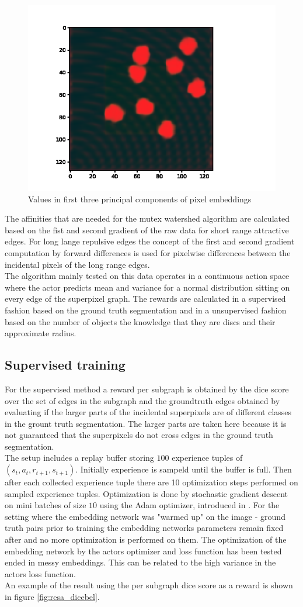 \begin{figure}[ht!]
	\centering
	\includegraphics[width=.5\textwidth]{figures/plots/pix_embeddings.png}
	\caption{Values in first three principal components of pixel embeddings}
	\label{fig:pixembeddings}
\end{figure}

The affinities that are needed for the mutex watershed algorithm are calculated based on the fist and second gradient of the raw data for short range attractive edges. For long lange repulsive edges the concept of the first and second gradient computation by forward differences is used for pixelwise differences between the incidental pixels of the long range edges.\\
The algorithm mainly tested on this data operates in a continuous action space where the actor predicts mean and variance for a normal distribution sitting on every edge of the superpixel graph. The rewards are calculated in a supervised fashion based on the ground truth segmentation and in a unsupervised fashion based on the number of objects the knowledge that they are discs and their approximate radius.
\subsection{Supervised training}
For the supervised method a reward per subgraph is obtained by the dice score over the set of edges in the subgraph and the groundtruth edges obtained by evaluating if the larger parts of the incidental superpixels are of different classes in the grount truth segmentation. The larger parts are taken here because it is not guaranteed that the superpixels do not cross edges in the ground truth segmentation.\\
The setup includes a replay buffer storing $100$ experience tuples of $(s_t, a_t, r_{t+1}, s_{t+1})$. Initially experience is sampeld until the buffer is full. Then after each collected experience tuple there are 10 optimization steps performed on sampled experience tuples. Optimization is done by stochastic gradient descent on mini batches of size $10$ using the Adam optimizer, introduced in \cite{kingma2014adam}. For the setting where the embedding network was "warmed up" on the image - ground truth pairs prior to training the embedding networks parameters remain fixed after and no more optimization is performed on them. The optimization of the embedding network by the actors optimizer and loss function has been tested ended in messy embeddings. This can be related to the high variance in the actors loss function.\\
An example of the result using the per subgraph dice score as a reward is shown in figure \ref{fig:resa_dicebel}.\\

